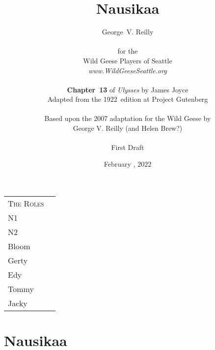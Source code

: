 


\title{\Huge Nausikaa}
\author{George~V. Reilly\\
\\
{\small for the}\\
Wild Geese Players of Seattle\\
{\textit{www.WildGeeseSeattle.org}}\\
\\
{\small \textbf{Chapter~13} of \textit{Ulysses} by James Joyce}\\
{\small Adapted from the 1922~edition at Project Gutenberg}
\\
\\
{\small Based upon the 2007 adaptation for the Wild Geese by}\\
{\small George V. Reilly
(and Helen Brew?)
}\\
\\
{\small First Draft}}
\date{February , 2022}
\raggedbottom



\maketitle
\thispagestyle{empty}
\pagebreak

\begin{tabular}{lp{10cm}}
    \multicolumn{1}{c}{\Large \textsc{The Roles}} \\
N1\\
N2\\
Bloom \\
Gerty \\
Edy \\
Tommy \\
Jacky \\
\end{tabular}

\thispagestyle{empty}
\newpage


\setcounter{page}{1}

\section*{Nausikaa}




